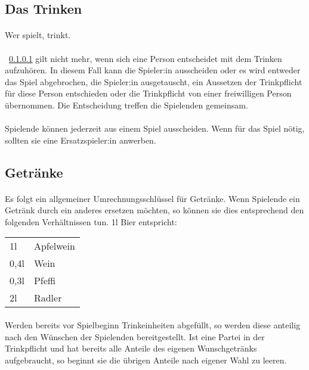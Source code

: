\subsection{Das Trinken}
\paragraph{}\label{Allgemeine_Regelungen:Trinken:Trink}
Wer spielt, trinkt.

\paragraph{}
~\ref{Allgemeine_Regelungen:Trinken:Trink} gilt nicht mehr, wenn sich eine Person entscheidet mit dem Trinken aufzuhören.
In diesem Fall kann die Spieler:in ausscheiden oder es wird entweder das Spiel abgebrochen, die Spieler:in ausgetauscht, ein Aussetzen der Trinkpflicht für diese Person entschieden oder die Trinkpflicht von einer freiwilligen Person übernommen.
Die Entscheidung treffen die Spielenden gemeinsam.

\paragraph{}
Spielende können jederzeit aus einem Spiel ausscheiden. Wenn für das Spiel nötig, sollten sie eine Ersatzspieler:in anwerben.

\subsection{Getränke}\label{Allgemeine_Regelungen:Getränke}
\paragraph{}\label{Allgemeine_Regelungen:Getränke:Umrechnung}
Es folgt ein allgemeiner Umrechnungsschlüssel für Getränke.
Wenn Spielende ein Getränk durch ein anderes ersetzen möchten, so können sie dies entsprechend den folgenden Verhältnissen tun.
1l Bier entspricht:

\begin{tabular}{l l}
	1l   & Apfelwein \\
	0,4l & Wein      \\
	0,3l & Pfeffi    \\
	2l   & Radler
\end{tabular}

\paragraph{}\label{Allgemeine_Regelungen:Getränke:Abfüllen}
Werden bereits vor Spielbeginn Trinkeinheiten abgefüllt, so werden diese anteilig nach den Wünschen der Spielenden bereitgestellt.
Ist eine Partei in der Trinkpflicht und hat bereits alle Anteile des eigenen Wunschgetränks aufgebraucht, so beginnt sie die übrigen Anteile nach eigener Wahl zu leeren.

